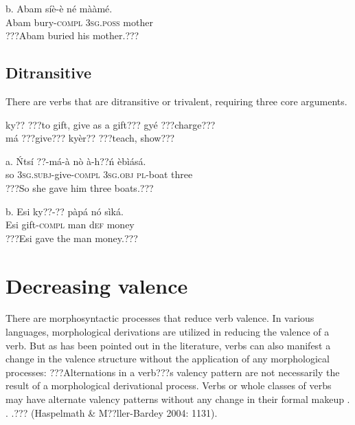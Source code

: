 \documentclass[output=paper]{langsci/langscibook}
\begin{document}
\ea
\gll  b.  Abam  síè-è     né    mààmé.\\
       Abam  bury-\textsc{compl}  \textsc{3sg.poss}  mother\\
\glt   ???Abam buried his mother.???
\z

\subsection{Ditransitive}

There are verbs that are ditransitive or trivalent, requiring three core arguments.

\ea
ky??   \textup{???to gift, give as a gift???  }  gyé   \textup{???charge???}\\
má     \textup{???give???}        kyèr??   \textup{???teach, show???}\\
\z

\ea
\gll a.  \'{N}tsí  ??{}-má-à      nò    à-h??ń    èbìásá.  \\
       so  \textsc{3sg.subj}{}-give-\textsc{compl}  \textsc{3sg.obj}  \textsc{pl}{}-boat    three\\
\glt ???So she gave him three boats.??? \citep[8]{Martin1936}
\z

\ea
\gll  b.  Esi  ky??-??    pàpá  nó   sìká.\\
       Esi  gift-\textsc{compl}  man  d\textsc{ef}  money\\
\glt   ???Esi gave the man money.???
\z

\section{Decreasing valence }

There are morphosyntactic processes that reduce verb valence. In various languages, morphological derivations are utilized in reducing the valence of a verb. But as has been pointed out in the literature, verbs can also manifest a change in the valence structure without the application of any morphological processes: ???Alternations in a verb???s valency pattern are not necessarily the result of a morphological derivational process. Verbs or whole classes of verbs may have alternate valency patterns without any change in their formal makeup . . .??? (Haspelmath \& M??ller-Bardey 2004: 1131).

\end{document}
